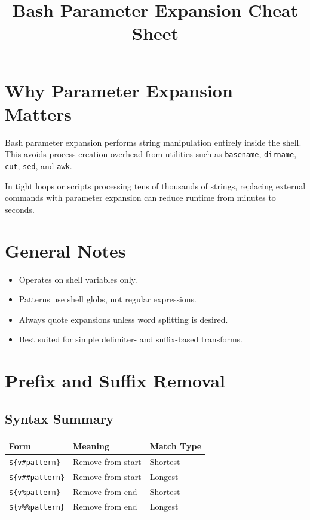 \documentclass[11pt]{article}
\title{Bash Parameter Expansion Cheat Sheet}
\author{}
\date{}
\begin{document}
\maketitle

\tableofcontents
\newpage

\section{Why Parameter Expansion Matters}

Bash parameter expansion performs string manipulation entirely inside the shell.
This avoids process creation overhead from utilities such as \texttt{basename},
\texttt{dirname}, \texttt{cut}, \texttt{sed}, and \texttt{awk}.

In tight loops or scripts processing tens of thousands of strings, replacing
external commands with parameter expansion can reduce runtime from minutes to seconds.

\section{General Notes}

\begin{itemize}
\item Operates on shell variables only.
\item Patterns use shell globs, not regular expressions.
\item Always quote expansions unless word splitting is desired.
\item Best suited for simple delimiter- and suffix-based transforms.
\end{itemize}

\section{Prefix and Suffix Removal}

\subsection{Syntax Summary}

\begin{longtable}{lll}
\toprule
Form & Meaning & Match Type \\
\midrule
\texttt{\$\{v\#pattern\}}   & Remove from start & Shortest \\
\texttt{\$\{v\#\#pattern\}} & Remove from start & Longest \\
\texttt{\$\{v\%pattern\}}   & Remove from end   & Shortest \\
\texttt{\$\{v\%\%pattern\}} & Remove from end   & Longest \\
\bottomrule
\end{longtable}
\end{document}
